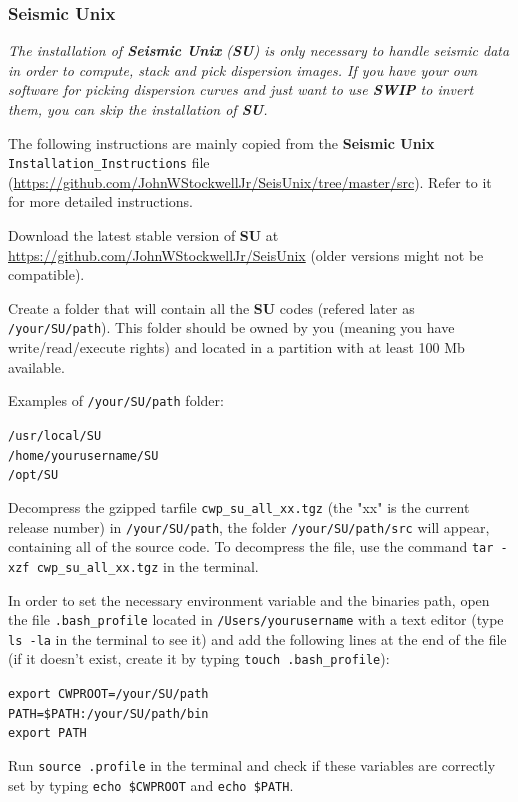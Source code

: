 \documentclass[twoside,a4paper]{article}
\def\SWIP{\textbf{SWIP}}
\def\SU{\textbf{SU}}
\def\SeismicUnix{\textbf{Seismic Unix}}
\begin{document}
\subsubsection{Seismic Unix}
\textit{The installation of {\SeismicUnix} ({\SU}) is only necessary to handle seismic data in order to compute, stack and pick dispersion images. If you have your own software for picking dispersion curves and just want to use {\SWIP} to invert them, you can skip the installation of {\SU}.}

The following instructions are mainly copied from the {\SeismicUnix} \verb|Installation_Instructions| file (\url{https://github.com/JohnWStockwellJr/SeisUnix/tree/master/src}). Refer to it for more detailed instructions.

Download the latest stable version of {\SU} at \url{https://github.com/JohnWStockwellJr/SeisUnix} (older versions might not be compatible).

Create a folder that will contain all the {\SU} codes (refered later as \verb|/your/SU/path|). This folder should be owned by you (meaning you have write/read/execute rights) and located in a partition with at least 100 Mb available.

Examples of \verb|/your/SU/path| folder:

\verb|/usr/local/SU|\\
\verb|/home/yourusername/SU|\\
\verb|/opt/SU|

Decompress the gzipped tarfile \verb|cwp_su_all_xx.tgz| (the "xx" is the current release number) in \verb|/your/SU/path|, the folder \verb|/your/SU/path/src| will appear, containing all of the source code. To decompress the file, use the command \verb|tar -xzf cwp_su_all_xx.tgz| in the terminal.

In order to set the necessary environment variable and the binaries path, open the file \verb|.bash_profile| located in \verb|/Users/yourusername| with a text editor (type \verb|ls -la| in the terminal to see it) and add the following lines at the end of the file (if it doesn't exist, create it by typing \verb|touch .bash_profile|):

\verb|export CWPROOT=/your/SU/path|\\
\verb|PATH=$PATH:/your/SU/path/bin|\\
\verb|export PATH|

Run \verb|source .profile| in the terminal and check if these variables are correctly set by typing \verb|echo $CWPROOT| and \verb|echo $PATH|.
\end{document}
